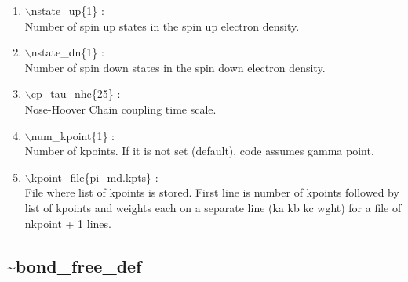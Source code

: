 \documentclass[12pt]{article}
\begin{document}
\begin{enumerate}

 \vspace{0.15in} 
 \item  $\backslash$nstate\_up\{1\} : \\ 
     Number of spin up states in the spin up electron density.

 \vspace{0.15in} 
 \item  $\backslash$nstate\_dn\{1\} : \\
     Number of spin down states in the spin down electron density.

 \vspace{0.15in} 
 \item  $\backslash$cp\_tau\_nhc\{25\} : \\
     Nose-Hoover Chain coupling time scale.

 \vspace{0.15in} 
 \item  $\backslash$num\_kpoint\{1\} : \\
  Number of kpoints. If it is not set (default), code assumes gamma point.

 \vspace{0.15in} 
 \item  $\backslash$kpoint\_file\{pi\_md.kpts\} : \\
 File where list of kpoints is stored. First line is number of kpoints followed
by list of kpoints and weights each on a separate line (ka kb kc  wght) for a 
file of nkpoint + 1 lines.

\end{enumerate}

\newpage
\subsection*{\bf \~{}bond\_free\_def}
\end{document}
